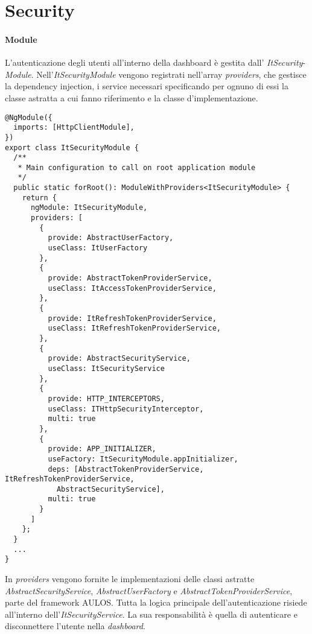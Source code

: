 \section{Security}
\label{chap:security}

\paragraph{Module}
L'autenticazione degli utenti all'interno della dashboard è gestita dall' \textit{ItSecurity}-\textit{Module}. Nell'\textit{ItSecurityModule} vengono registrati nell'array \textit{providers}, che gestisce la dependency injection, i service necessari specificando per ognuno di essi la classe astratta a cui fanno riferimento e la classe d'implementazione.
\begin{lstlisting}[caption={Injection dei service nell'ItSecurityModule}, style=javaScriptCode]
@NgModule({
  imports: [HttpClientModule],
})
export class ItSecurityModule {
  /**
   * Main configuration to call on root application module
   */
  public static forRoot(): ModuleWithProviders<ItSecurityModule> {
    return {
      ngModule: ItSecurityModule,
      providers: [
        {
          provide: AbstractUserFactory,
          useClass: ItUserFactory
        },
        {
          provide: AbstractTokenProviderService,
          useClass: ItAccessTokenProviderService,
        },
        {
          provide: ItRefreshTokenProviderService,
          useClass: ItRefreshTokenProviderService,
        },
        {
          provide: AbstractSecurityService,
          useClass: ItSecurityService
        },
        {
          provide: HTTP_INTERCEPTORS,
          useClass: ITHttpSecurityInterceptor,
          multi: true
        },
        {
          provide: APP_INITIALIZER,
          useFactory: ItSecurityModule.appInitializer,
          deps: [AbstractTokenProviderService, ItRefreshTokenProviderService, 
            AbstractSecurityService],
          multi: true
        }
      ]
    };
  }
  ...
}
\end{lstlisting}
In \textit{providers} vengono fornite le implementazioni delle classi astratte
\textit{AbstractSecurityService}, \textit{AbstractUserFactory} e \textit{AbstractTokenProviderService}, parte del framework AULOS.
Tutta la logica principale dell'autenticazione risiede all'interno dell'\textit{ItSecurityService}. La sua responsabilità è quella di autenticare e disconnettere l'utente nella \textit{dashboard}.
